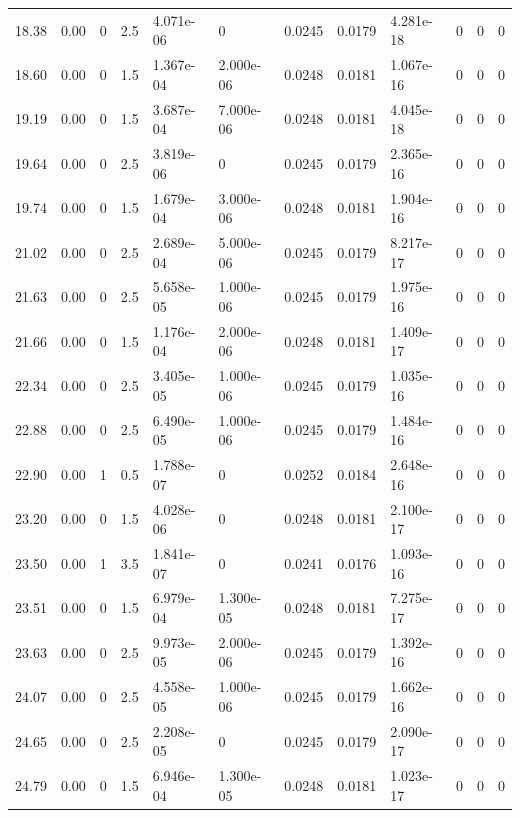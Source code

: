 \documentclass[preview]{standalone}
\begin{document}
{{{\begin{tabular}{L{1.2cm}C{1.2cm} C{0.3cm}C{0.5cm} C{1.4cm}C{1.4cm} C{1.4cm}C{1.4cm} C{1.6cm}C{1.6cm} C{1.6cm}C{1.6cm}}
  18.38  &  0.00  & 0     & 2.5 &  4.071e-06  & 0  &  0.0245&   0.0179& 4.281e-18 & 0   &  0 & 0  \\ 
  18.60  &  0.00  & 0     & 1.5 &  1.367e-04  & 2.000e-06  &  0.0248&   0.0181& 1.067e-16 & 0   &  0 & 0  \\ 
  19.19  &  0.00  & 0     & 1.5 &  3.687e-04  & 7.000e-06  &  0.0248&   0.0181& 4.045e-18 & 0   &  0 & 0  \\ 
  19.64  &  0.00  & 0     & 2.5 &  3.819e-06  & 0  &  0.0245&   0.0179& 2.365e-16 & 0   &  0 & 0  \\ 
  19.74  &  0.00  & 0     & 1.5 &  1.679e-04  & 3.000e-06  &  0.0248&   0.0181& 1.904e-16 & 0   &  0 & 0  \\ 
  21.02  &  0.00  & 0     & 2.5 &  2.689e-04  & 5.000e-06  &  0.0245&   0.0179& 8.217e-17 & 0   &  0 & 0  \\ 
  21.63  &  0.00  & 0     & 2.5 &  5.658e-05  & 1.000e-06  &  0.0245&   0.0179& 1.975e-16 & 0   &  0 & 0  \\ 
  21.66  &  0.00  & 0     & 1.5 &  1.176e-04  & 2.000e-06  &  0.0248&   0.0181& 1.409e-17 & 0   &  0 & 0  \\ 
  22.34  &  0.00  & 0     & 2.5 &  3.405e-05  & 1.000e-06  &  0.0245&   0.0179& 1.035e-16 & 0   &  0 & 0  \\ 
  22.88  &  0.00  & 0     & 2.5 &  6.490e-05  & 1.000e-06  &  0.0245&   0.0179& 1.484e-16 & 0   &  0 & 0  \\ 
  22.90  &  0.00  & 1     & 0.5 &  1.788e-07  & 0  &  0.0252&   0.0184& 2.648e-16 & 0   &  0 & 0  \\ 
  23.20  &  0.00  & 0     & 1.5 &  4.028e-06  & 0  &  0.0248&   0.0181& 2.100e-17 & 0   &  0 & 0  \\ 
  23.50  &  0.00  & 1     & 3.5 &  1.841e-07  & 0  &  0.0241&   0.0176& 1.093e-16 & 0   &  0 & 0  \\ 
  23.51  &  0.00  & 0     & 1.5 &  6.979e-04  & 1.300e-05  &  0.0248&   0.0181& 7.275e-17 & 0   &  0 & 0  \\ 
  23.63  &  0.00  & 0     & 2.5 &  9.973e-05  & 2.000e-06  &  0.0245&   0.0179& 1.392e-16 & 0   &  0 & 0  \\ 
  24.07  &  0.00  & 0     & 2.5 &  4.558e-05  & 1.000e-06  &  0.0245&   0.0179& 1.662e-16 & 0   &  0 & 0  \\ 
  24.65  &  0.00  & 0     & 2.5 &  2.208e-05  & 0  &  0.0245&   0.0179& 2.090e-17 & 0   &  0 & 0  \\ 
  24.79  &  0.00  & 0     & 1.5 &  6.946e-04  & 1.300e-05  &  0.0248&   0.0181& 1.023e-17 & 0   &  0 & 0  \\ 

\end{tabular}}}}
\end{document}
